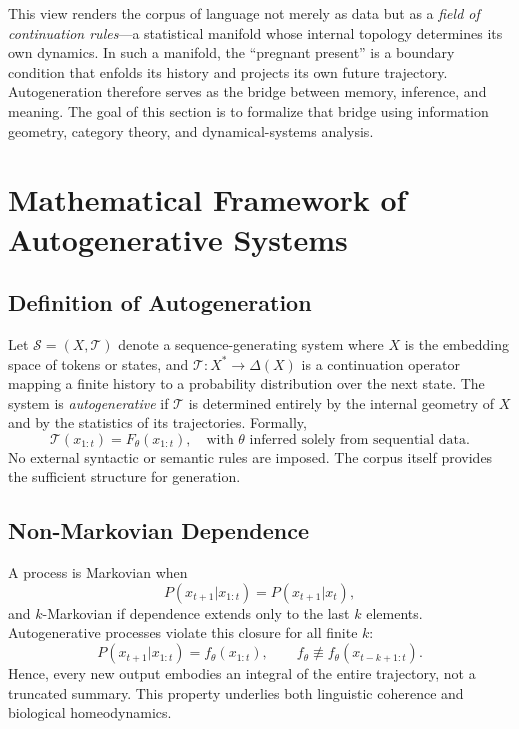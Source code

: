 \documentclass[12pt,a4paper,twoside,openright]{book}
\begin{document}
This view renders the corpus of language not merely as data but as a \emph{field of continuation rules}—a statistical manifold whose internal topology determines its own dynamics. In such a manifold, the ``pregnant present'' is a boundary condition that enfolds its history and projects its own future trajectory. Autogeneration therefore serves as the bridge between memory, inference, and meaning. The goal of this section is to formalize that bridge using information geometry, category theory, and dynamical-systems analysis.

\section{Mathematical Framework of Autogenerative Systems}
\subsection{Definition of Autogeneration}
Let $\mathcal{S} = (X, \mathcal{T})$ denote a sequence-generating system where $X$ is the embedding space of tokens or states, and $\mathcal{T}: X^* \to \Delta(X)$ is a continuation operator mapping a finite history to a probability distribution over the next state. The system is \emph{autogenerative} if $\mathcal{T}$ is determined entirely by the internal geometry of $X$ and by the statistics of its trajectories. Formally,
\begin{equation}
\mathcal{T}(x_{1:t}) = F_\theta(x_{1:t}), \quad \text{with } \theta \text{ inferred solely from sequential data.}
\end{equation}
No external syntactic or semantic rules are imposed. The corpus itself provides the sufficient structure for generation.

\subsection{Non-Markovian Dependence}
A process is Markovian when
\begin{equation}
P(x_{t+1}|x_{1:t}) = P(x_{t+1}|x_t),
\end{equation}
and $k$-Markovian if dependence extends only to the last $k$ elements. Autogenerative processes violate this closure for all finite $k$:
\begin{equation}
P(x_{t+1}|x_{1:t}) = f_\theta(x_{1:t}), \qquad
f_\theta \not\equiv f_\theta(x_{t-k+1:t}).
\end{equation}
Hence, every new output embodies an integral of the entire trajectory, not a truncated summary. This property underlies both linguistic coherence and biological homeodynamics.
\end{document}

